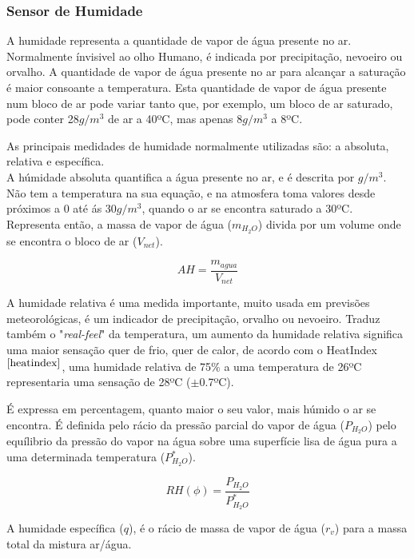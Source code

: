 \documentclass[12pt]{article}
\begin{document}
\subsubsection{Sensor de Humidade}
\par A humidade representa a quantidade de vapor de água presente no ar. Normalmente ínvisivel ao olho Humano, é indicada por precipitação, nevoeiro ou orvalho. A quantidade de vapor de água presente no ar para alcançar a saturação é maior consoante a temperatura. Esta quantidade de vapor de água presente num bloco de ar pode variar tanto que, por exemplo, um bloco de ar saturado, pode conter 28$g/m^3$ de ar a 40ºC, mas apenas 8$g/m^3$ a 8ºC.\\
\par As principais medidades de humidade normalmente utilizadas são: a absoluta, relativa e específica. \\
A húmidade absoluta quantifica a água presente no ar, e é descrita por $g/m^3$. Não tem a temperatura na sua equação, e na atmosfera toma valores desde próximos a 0 até ás 30$g/m^3$, quando o ar se encontra saturado a 30ºC. Representa então, a massa de vapor de água ($m_{H_2O}$) divida por um volume onde se encontra o bloco de ar ($V_{net}$).

\begin{equation}
    AH = \frac{m_{agua}}{V_{net}}
\end{equation}

A humidade relativa é uma medida importante, muito usada em previsões meteorológicas, é um indicador de precipitação, orvalho ou nevoeiro. Traduz também o "\textit{real-feel}" da temperatura, um aumento da humidade relativa significa uma maior sensação quer de frio, quer de calor, de acordo com o HeatIndex$^{\cite{heatindex}}$, uma humidade relativa de 75$\%$ a uma temperatura de 26ºC representaria uma sensação de 28ºC ($\pm$0.7ºC).\\
\par É expressa em percentagem, quanto maior o seu valor, mais húmido o ar se encontra. É definida pelo rácio da pressão parcial do vapor de água ($P_{H_2O}$) pelo equílibrio da pressão do vapor na água sobre uma superfície lisa de água pura a uma determinada temperatura ($P^*_{H_2O}$).

\begin{equation}
    RH (\phi) = \frac{P_{H_2O}}{P^*_{H_2O}}
\end{equation}

A humidade específica ($q$), é o rácio de massa de vapor de água ($r_v$) para a massa total da mistura ar/água.
\end{document}
